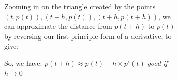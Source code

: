 \documentclass[11pt, a4paper]{article}
\begin{document}
\begin{figure}[H]
\centering
\begin{subfigure}[b]{0.49\textwidth}
\centering
{}
\end{subfigure}
\hfill
\begin{subfigure}[b]{0.49\textwidth}
\small
Zooming in on the triangle created by the points $(t,p(t)), (t+h, p(t)), (t+h, p(t+h))$, we can approximate the distance from $p(t+h)$ to $p(t)$ by reversing our first principle form of a derivative, to give:
\normalsize
\begin{center}
\end{center}
So, we have: $p(t+h)\approx p(t)+h\times p'(t)$ \scriptsize{\emph{good if $h\rightarrow 0$}}
\normalsize
\end{subfigure}
\end{figure}
\end{document}

